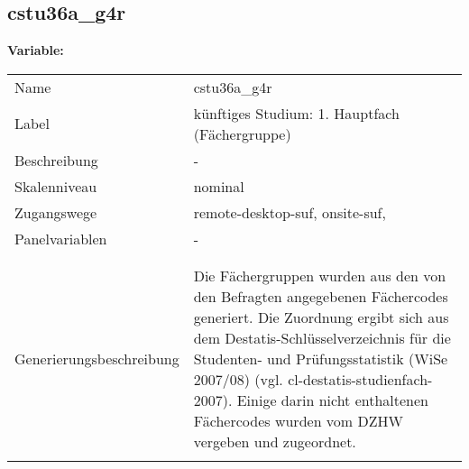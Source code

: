	
	
	\subsection{cstu36a\_g4r}
	\label{subSection:cstu36a_g4r}

	\noindent\textbf{Variable:}\\
		\begin{tabular}{lL{11.3cm}}
			\label{tableVariable:cstu36a_g4r}
			Name & cstu36a\_g4r \\
			Label & künftiges Studium: 1. Hauptfach (Fächergruppe) \\
			Beschreibung & - \\
			Skalenniveau & nominal \\
			Zugangswege &
				remote-desktop-suf,
				onsite-suf,
 \\
			Panelvariablen & -
			 \\
			 \\
 \\
					Generierungsbeschreibung & Die Fächergruppen wurden aus den von den Befragten angegebenen Fächercodes generiert. Die Zuordnung ergibt sich aus dem Destatis-Schlüsselverzeichnis für die Studenten- und Prüfungsstatistik (WiSe 2007/08) (vgl. cl-destatis-studienfach-2007).  Einige darin nicht enthaltenen Fächercodes wurden vom DZHW vergeben und zugeordnet. 
				 \\	
			 \\
		\end{tabular}






